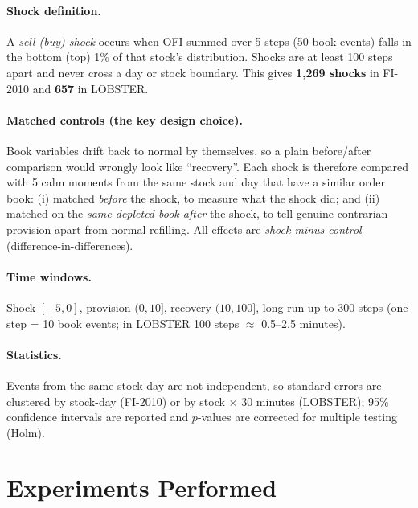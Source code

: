 \documentclass[11pt,a4paper]{article}
\begin{document}
\paragraph{Shock definition.} A \emph{sell (buy) shock} occurs when OFI summed over 5 steps (50 book events)
falls in the bottom (top) 1\% of that stock's distribution. Shocks are at least 100 steps apart and never cross
a day or stock boundary. This gives \textbf{1{,}269 shocks} in FI-2010 and \textbf{657} in LOBSTER.

\paragraph{Matched controls (the key design choice).} Book variables drift back to normal by themselves, so a
plain before/after comparison would wrongly look like ``recovery''. Each shock is therefore compared with
5 calm moments from the same stock and day that have a similar order book:
(i) matched \emph{before} the shock, to measure what the shock did; and
(ii) matched on the \emph{same depleted book after} the shock, to tell genuine contrarian provision apart
from normal refilling. All effects are \emph{shock minus control} (difference-in-differences).

\paragraph{Time windows.} Shock $[-5,0]$, provision $(0,10]$, recovery $(10,100]$, long run up to 300 steps
(one step = 10 book events; in LOBSTER 100 steps $\approx$ 0.5--2.5 minutes).

\paragraph{Statistics.} Events from the same stock-day are not independent, so standard errors are clustered
by stock-day (FI-2010) or by stock $\times$ 30 minutes (LOBSTER); 95\% confidence intervals are reported and
$p$-values are corrected for multiple testing (Holm).

\section{Experiments Performed}
\label{sec:experiments}
\end{document}
